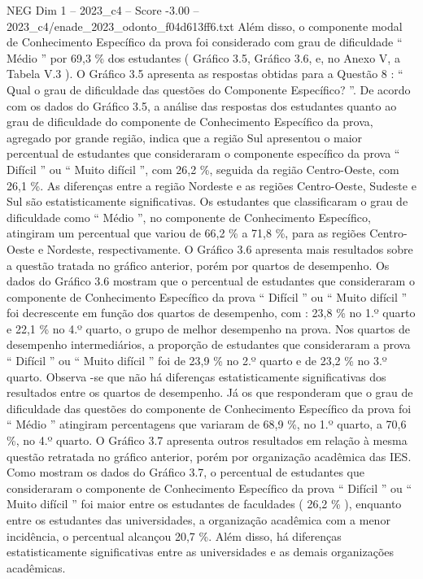 \begin{textsample}{NEG Dim 1 – 2023\_c4 – Score -3.00 – 2023\_c4/enade\_2023\_odonto\_f04d613ff6.txt}
Além disso, o componente modal de Conhecimento Específico da prova foi considerado com grau de dificuldade “ Médio ” por 69,3 \% dos estudantes ( Gráfico 3.5, Gráfico 3.6, e, no Anexo V, a Tabela V.3 ).
O Gráfico 3.5 apresenta as respostas obtidas para a Questão 8 : “ Qual o grau de dificuldade das questões do Componente Específico? ”.
De acordo com os dados do Gráfico 3.5, a análise das respostas dos estudantes quanto ao grau de dificuldade do componente de Conhecimento Específico da prova, agregado por grande região, indica que a região Sul apresentou o maior percentual de estudantes que consideraram o componente específico da prova “ Difícil ” ou “ Muito difícil ”, com 26,2 \%, seguida da região Centro-Oeste, com 26,1 \%.
As diferenças entre a região Nordeste e as regiões Centro-Oeste, Sudeste e Sul são estatisticamente significativas.
Os estudantes que classificaram o grau de dificuldade como “ Médio ”, no componente de Conhecimento Específico, atingiram um percentual que variou de 66,2 \% a 71,8 \%, para as regiões Centro-Oeste e Nordeste, respectivamente.
O Gráfico 3.6 apresenta mais resultados sobre a questão tratada no gráfico anterior, porém por quartos de desempenho.
Os dados do Gráfico 3.6 mostram que o percentual de estudantes que consideraram o componente de Conhecimento Específico da prova “ Difícil ” ou “ Muito difícil ” foi decrescente em função dos quartos de desempenho, com : 23,8 \% no 1.º quarto e 22,1 \% no 4.º quarto, o grupo de melhor desempenho na prova.
Nos quartos de desempenho intermediários, a proporção de estudantes que consideraram a prova “ Difícil ” ou “ Muito difícil ” foi de 23,9 \% no 2.º quarto e de 23,2 \% no 3.º quarto.
Observa -se que não há diferenças estatisticamente significativas dos resultados entre os quartos de desempenho.
Já os que responderam que o grau de dificuldade das questões do componente de Conhecimento Específico da prova foi “ Médio ” atingiram percentagens que variaram de 68,9 \%, no 1.º quarto, a 70,6 \%, no 4.º quarto.
O Gráfico 3.7 apresenta outros resultados em relação à mesma questão retratada no gráfico anterior, porém por organização acadêmica das IES.
Como mostram os dados do Gráfico 3.7, o percentual de estudantes que consideraram o componente de Conhecimento Específico da prova “ Difícil ” ou “ Muito difícil ” foi maior entre os estudantes de faculdades ( 26,2 \% ), enquanto entre os estudantes das universidades, a organização acadêmica com a menor incidência, o percentual alcançou 20,7 \%.
Além disso, há diferenças estatisticamente significativas entre as universidades e as demais organizações acadêmicas.

\end{textsample}
